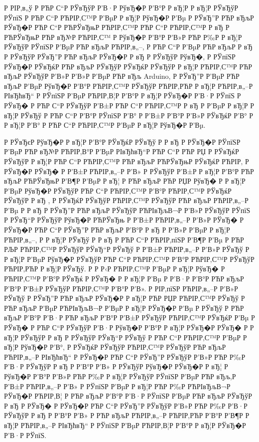 \documentclass[a4paper,14pt]{extarticle}
\begin{document}
Р  РІР‚в„ў Р РЋР С“Р  РЎвЂўР  Р’В·Р  РўвЂ�Р  Р’В°Р  Р вЂ¦Р  Р вЂ¦Р  РЎвЂўР  РЎпїЅ Р РЋР С“Р РЋРІР‚С™Р  Р’ВµР  Р вЂ¦Р  РўвЂ�Р  Р’Вµ Р  РЎвЂ”Р РЋР вЂљР  РЎвЂ�Р РЋР С“Р РЋРЎвЂњР РЋРІР‚С™Р РЋР С“Р РЋРІР‚С™Р  Р вЂ Р РЋРЎвЂњР РЋР вЂ№Р РЋРІР‚С™ Р  РўвЂ�Р  Р’В°Р  Р’В»Р РЋР Р‰Р  Р вЂ¦Р  РЎвЂўР  РЎпїЅР  Р’ВµР РЋР вЂљР РЋРІР‚в„–, Р РЋР С“Р  Р’ВµР РЋР вЂљР  Р вЂ Р  РЎвЂўР  РЎвЂ”Р РЋР вЂљР  РЎвЂ�Р  Р вЂ Р  РЎвЂўР  РўвЂ�, Р  РЎпїЅР  РЎвЂ�Р  РЎвЂќР РЋР вЂљР  РЎвЂўР  РЎвЂќР  РЎвЂўР  Р вЂ¦Р РЋРІР‚С™Р РЋР вЂљР  РЎвЂўР  Р’В»Р  Р’В»Р  Р’ВµР РЋР вЂљ Arduino, Р  РЎвЂ”Р  Р’ВµР РЋР вЂљР  Р’ВµР  РўвЂ�Р  Р’В°Р РЋРІР‚С™Р  РЎвЂўР РЋРІР‚РЋР  Р вЂ¦Р РЋРІР‚в„–Р  РІвЂћвЂ“ Р  РЎпїЅР  Р’ВµР РЋРІР‚В¦Р  Р’В°Р  Р вЂ¦Р  РЎвЂ�Р  Р’В·Р  РЎпїЅ Р  РЎвЂ� Р РЋР С“Р  РЎвЂўР  Р’В±Р РЋР С“Р РЋРІР‚С™Р  Р вЂ Р  Р’ВµР  Р вЂ¦Р  Р вЂ¦Р  РЎвЂў Р РЋР С“Р  Р’В°Р  РЎпїЅР  Р’В° Р  Р’В±Р  Р’В°Р  Р’В»Р  РЎвЂќР  Р’В° Р  Р вЂ¦Р  Р’В° Р РЋР С“Р РЋРІР‚С™Р  Р’ВµР  Р вЂ¦Р  РўвЂ�Р  Р’Вµ.

Р  РЎвЂєР  РўвЂ�Р  Р вЂ¦Р  Р’В°Р  РЎвЂќР  РЎвЂў Р  Р вЂ  Р  РЎвЂ�Р  РЎпїЅР  Р’ВµР РЋР вЂ№Р РЋРІР‚В°Р  Р’ВµР  РІвЂћвЂ“Р РЋР С“Р РЋР РЏ Р  РЎвЂќР  РЎвЂўР  Р вЂ¦Р РЋР С“Р РЋРІР‚С™Р РЋР вЂљР РЋРЎвЂњР  РЎвЂќР РЋРІР‚ Р  РЎвЂ�Р  РЎвЂ� Р  Р’В±Р РЋРІР‚в„–Р  Р’В» Р  РЎвЂўР  Р’В±Р  Р вЂ¦Р  Р’В°Р РЋР вЂљР РЋРЎвЂњР  Р’В¶Р  Р’ВµР  Р вЂ¦ Р РЋР вЂљР РЋР РЏР  РўвЂ� Р  Р вЂ¦Р  Р’ВµР  РўвЂ�Р  РЎвЂўР РЋР С“Р РЋРІР‚С™Р  Р’В°Р РЋРІР‚С™Р  РЎвЂќР  РЎвЂўР  Р вЂ , Р  РЎвЂќР  РЎвЂўР РЋРІР‚С™Р  РЎвЂўР РЋР вЂљР РЋРІР‚в„–Р  Р’Вµ Р  Р вЂ  Р  РЎвЂ”Р РЋР вЂљР  РЎвЂўР РЋРІвЂљВ¬Р  Р’В»Р  РЎвЂўР  РЎпїЅ Р  РЎвЂ“Р  РЎвЂўР  РўвЂ�Р РЋРЎвЂњ Р  Р’В±Р РЋРІР‚в„–Р  Р’В»Р  РЎвЂ� Р  РЎвЂ�Р РЋР С“Р  РЎвЂ”Р РЋР вЂљР  Р’В°Р  Р вЂ Р  Р’В»Р  Р’ВµР  Р вЂ¦Р РЋРІР‚в„–, Р  Р вЂ¦Р  РЎвЂў Р  Р вЂ Р РЋР С“Р РЋРІР‚пїЅР  Р’В¶Р  Р’Вµ Р РЋР РЉР РЋРІР‚С™Р  РЎвЂўР  РЎвЂ“Р  РЎвЂў Р  Р’В±Р РЋРІР‚в„–Р  Р’В»Р  РЎвЂў Р  Р вЂ¦Р  Р’ВµР  РўвЂ�Р  РЎвЂўР РЋР С“Р РЋРІР‚С™Р  Р’В°Р РЋРІР‚С™Р  РЎвЂўР РЋРІР‚РЋР  Р вЂ¦Р  РЎвЂў. Р  Р Р‹Р РЋРІР‚С™Р  Р’ВµР  Р вЂ¦Р  РўвЂ� Р РЋРІР‚С™Р  Р’В°Р  РЎвЂќ Р  РЎвЂ� Р  Р вЂ¦Р  Р’Вµ Р  Р’В·Р  Р’В°Р РЋР вЂљР  Р’В°Р  Р’В±Р  РЎвЂўР РЋРІР‚С™Р  Р’В°Р  Р’В». Р  РІР‚пїЅР РЋРІР‚в„–Р  Р’В»Р  РЎвЂў Р  РЎвЂ”Р РЋР вЂљР  РЎвЂ�Р  Р вЂ¦Р РЋР РЏР РЋРІР‚С™Р  РЎвЂў Р РЋР вЂљР  Р’ВµР РЋРІвЂљВ¬Р  Р’ВµР  Р вЂ¦Р  РЎвЂ�Р  Р’Вµ Р  РЎвЂў Р РЋР вЂљР  Р’В°Р  Р’В·Р РЋР вЂљР  Р’В°Р  Р’В±Р  РЎвЂўР РЋРІР‚С™Р  РЎвЂќР  Р’Вµ Р  РЎвЂ� Р РЋР С“Р  РЎвЂўР  Р’В·Р  РўвЂ�Р  Р’В°Р  Р вЂ¦Р  РЎвЂ�Р  РЎвЂ� Р  Р вЂ¦Р  РЎвЂўР  Р вЂ Р  РЎвЂўР  РЎвЂ“Р  РЎвЂў Р РЋР С“Р РЋРІР‚С™Р  Р’ВµР  Р вЂ¦Р  РўвЂ�Р  Р’В°, Р  РЎвЂќР  РЎвЂўР РЋРІР‚С™Р  РЎвЂўР РЋР вЂљР РЋРІР‚в„–Р  РІвЂћвЂ“ Р  РЎвЂ�Р РЋР С“Р  РЎвЂ”Р  РЎвЂўР  Р’В»Р РЋР Р‰Р  Р’В·Р  РЎвЂўР  Р вЂ Р  Р’В°Р  Р’В» Р  РЎвЂўР  РўвЂ�Р  РЎвЂ�Р  Р вЂ¦ Р  РўвЂ�Р  Р’В°Р  Р’В»Р РЋР Р‰Р  Р вЂ¦Р  РЎвЂўР  РЎпїЅР  Р’ВµР РЋР вЂљ,Р  Р’В±Р РЋРІР‚в„–Р  Р’В» Р  РЎпїЅР  Р’ВµР  Р вЂ¦Р РЋР Р‰Р РЋРІвЂљВ¬Р  РЎвЂ�Р РЋРІР‚В¦ Р РЋР вЂљР  Р’В°Р  Р’В·Р  РЎпїЅР  Р’ВµР РЋР вЂљР  РЎвЂўР  Р вЂ  Р  РЎвЂ� Р  РЎвЂ�Р РЋР С“Р  РЎвЂ”Р  РЎвЂўР  Р’В»Р РЋР Р‰Р  Р’В·Р  РЎвЂўР  Р вЂ Р  Р’В°Р  Р’В» Р РЋР вЂљР РЋРІР‚в„–Р РЋРІР‚РЋР  Р’В°Р  Р’В¶Р  Р вЂ¦Р РЋРІР‚в„–Р  РІвЂћвЂ“ Р  РЎпїЅР  Р’ВµР РЋРІР‚В¦Р  Р’В°Р  Р вЂ¦Р  РЎвЂ�Р  Р’В·Р  РЎпїЅ. 
\end{document}
